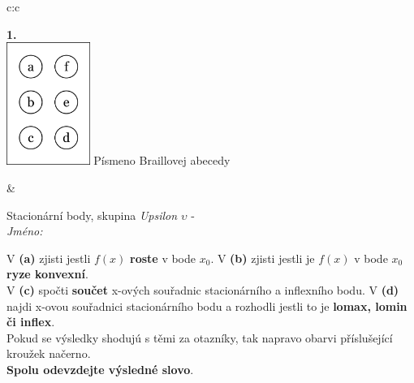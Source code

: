 \documentclass[10pt]{report}
\begin{document}
\begin{tabular}{c:c}
\begin{minipage}[c][104.5mm][t]{0.5\linewidth}
\begin{center}
\begin{minipage}{0.79\linewidth}
\end{minipage}
\begin{minipage}{0.20\linewidth}
\begin{center}
{\Huge\bfseries 1.} \\[2mm]
\includegraphics[height=40mm]{../images/braille.png}
{\small Písmeno Braillovej abecedy}
\end{center}
\end{minipage}
\end{center}
\end{minipage}
&
\begin{minipage}[c][104.5mm][t]{0.5\linewidth}
\begin{center}
\vspace{7mm}
{\huge Stacionární body, skupina \textit{Upsilon $\upsilon$} -}\\[5mm]
\textit{Jméno:}\phantom{xxxxxxxxxxxxxxxxxxxxxxxxxxxxxxxxxxxxxxxxxxxxxxxxxxxxxxxxxxxxxxxxx}\\[5mm]
\begin{minipage}{0.95\linewidth}
\begin{center}
{\small V \textbf{(a)} zjisti jestli $f(x)$ \textbf{roste} v bode $x_0$. V \textbf{(b)} zjisti jestli je $f(x)$ v bode $x_0$ \textbf{ryze konvexní}.\\V \textbf{(c)} spočti \textbf{součet} x-ových souřadnic stacionárního a inflexního bodu. V \textbf{(d)} najdi x-ovou souřadnici stacionárního bodu a rozhodli jestli to je \textbf{lomax, lomin či inflex}.\\Pokud se výsledky shodujú s těmi za otazníky, tak napravo obarvi příslušející kroužek načerno.\\\textbf{Spolu odevzdejte výsledné slovo}}.
\end{center}
\end{minipage}
\\[1mm]
\begin{minipage}{0.79\linewidth}
\begin{center}
\begin{varwidth}{\linewidth}
\begin{enumerate}
\normalsize

\end{enumerate}
\end{varwidth}
\end{center}
\end{minipage}
\end{center}
\end{minipage}
\end{tabular}
\end{document}
